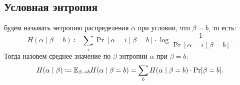\subsection{Условная энтропия}
\begin{defn}
	 будем называть энтропию распределения $  \alpha $ при условии, что $ \beta = b$, то есть:
	\[
	H( \alpha \mid \beta  = b) \coloneqq  \sum_{i}^{} \Pr[ \alpha = i \mid  \beta  = b] \cdot  \log \frac{1}{\Pr [ \alpha  = i \mid \beta  = b]}
.\]
Тогда  назовем среднее значение по $ \beta$ энтропии $  \alpha $ при $ \beta = b$:
\[
	H( \alpha  \mid \beta ) \coloneqq  \mathbb{E}_{\beta \to b } H( \alpha  \mid \beta = b)  = \sum_{b} H ( \alpha  \mid \beta = b) \cdot  \Pr[\beta = b]
.\] 
\end{defn}
